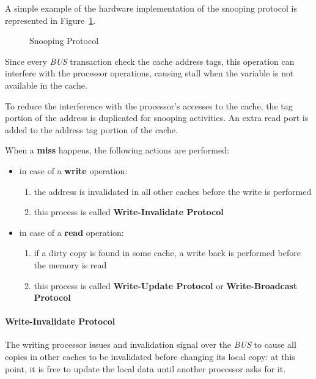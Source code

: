 \documentclass[english]{article}
\begin{document}
A simple example of the hardware implementation of the snooping protocol is represented in Figure~\ref{fig:snooping-protocol}.

\begin{figure}[htbp]
  \bigskip
  \centering
  \caption{Snooping Protocol}
  \label{fig:snooping-protocol}
  \bigskip
\end{figure}

\bigskip
Since every \textit{BUS} transaction check the cache address tags, this operation can interfere with the processor operations, causing stall when the variable is not available in the cache.

To reduce the interference with the processor's accesses to the cache, the tag portion of the address is duplicated for snooping activities.
An extra read port is added to the address tag portion of the cache.

\bigskip
When a \textbf{miss} happens, the following actions are performed:

\begin{itemize}
  \item in case of a \textbf{write} operation:
        \begin{enumerate}
          \item the address is invalidated in all other caches before the write is performed
          \item this process is called \textbf{Write-Invalidate Protocol}
        \end{enumerate}
  \item in case of a \textbf{read} operation:
        \begin{enumerate}
          \item if a dirty copy is found in some cache, a write back is performed before the memory is read
          \item this process is called \textbf{Write-Update Protocol} or \textbf{Write-Broadcast Protocol}
        \end{enumerate}
\end{itemize}

\paragraph{Write-Invalidate Protocol}

The writing processor issues and invalidation signal over the \textit{BUS} to cause all copies in other caches to be invalidated before changing its local copy: at this point, it is free to update the local data until another processor asks for it.
\end{document}
